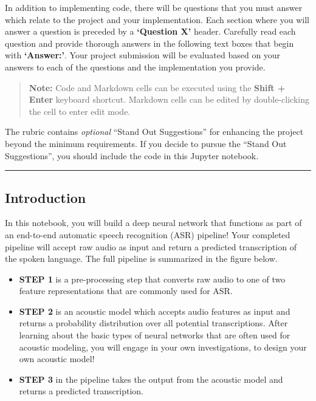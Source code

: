\documentclass[11pt]{article}
\providecommand{\tightlist}{%
      \setlength{\itemsep}{0pt}\setlength{\parskip}{0pt}}
\begin{document}
In addition to implementing code, there will be questions that you must
answer which relate to the project and your implementation. Each section
where you will answer a question is preceded by a \textbf{`Question X'}
header. Carefully read each question and provide thorough answers in the
following text boxes that begin with \textbf{`Answer:'}. Your project
submission will be evaluated based on your answers to each of the
questions and the implementation you provide.

\begin{quote}
\textbf{Note:} Code and Markdown cells can be executed using the
\textbf{Shift + Enter} keyboard shortcut. Markdown cells can be edited
by double-clicking the cell to enter edit mode.
\end{quote}

The rubric contains \emph{optional} ``Stand Out Suggestions'' for
enhancing the project beyond the minimum requirements. If you decide to
pursue the ``Stand Out Suggestions'', you should include the code in
this Jupyter notebook.

\begin{center}\rule{0.5\linewidth}{\linethickness}\end{center}

\hypertarget{introduction}{%
\subsection{Introduction}\label{introduction}}

In this notebook, you will build a deep neural network that functions as
part of an end-to-end automatic speech recognition (ASR) pipeline! Your
completed pipeline will accept raw audio as input and return a predicted
transcription of the spoken language. The full pipeline is summarized in
the figure below.

\begin{itemize}
\tightlist
\item
  \textbf{STEP 1} is a pre-processing step that converts raw audio to
  one of two feature representations that are commonly used for ASR.
\item
  \textbf{STEP 2} is an acoustic model which accepts audio features as
  input and returns a probability distribution over all potential
  transcriptions. After learning about the basic types of neural
  networks that are often used for acoustic modeling, you will engage in
  your own investigations, to design your own acoustic model!
\item
  \textbf{STEP 3} in the pipeline takes the output from the acoustic
  model and returns a predicted transcription.
\end{itemize}
\end{document}
